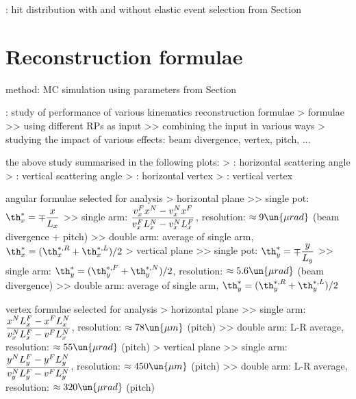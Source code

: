 \> : hit distribution with and without elastic event selection from Section 



\chapter[reco-form]{Reconstruction formulae}

\> method: MC simulation using parameters from Section 

\>  : study of performance of various kinematics reconstruction formulae
\>> formulae
\>>> using different RPs as input
\>>> combining the input in various ways
\>> studying the impact of various effects: beam divergence, vertex, pitch, ...

\> the above study summarised in the following plots:
\>> : horizontal scattering angle
\>> : vertical scattering angle
\>> : horizontal vertex
\>> : vertical vertex

\iffalse
\> \plot{reconstruction_formulae/plot_formulae_correlation.pdf} : study of left-right correlations of angle reconstruction errors
\>> significant in $x$ due to neglecting $x^*$
\fi

\> angular formulae selected for analysis
\>> horizontal plane
\>>> single pot: $\displaystyle \th_x^{*} = \mp {x\over L_x}$
\>>> single arm: $\displaystyle {v_x^F x^N - v_x^N x^F\over v_x^F L_x^N - v_x^N L_x^F}$, resolution: $\approx 9\un{\mu rad}$ (beam divergence + pitch)
\>>> double arm: average of single arm, $\th_x^* = (\th_x^{*,R} + \th_x^{*,L}) / 2$
\>> vertical plane
\>>> single pot: $\displaystyle \th_y^{*} = \mp {y\over L_y}$
\>>> single arm: $\displaystyle \th_y^{*} = (\th_y^{*,F} + \th_y^{*,N}) / 2$, resolution: $\approx 5.6\un{\mu rad}$ (beam divergence)
\>>> double arm: average of single arm, $\th_y^* = (\th_y^{*,R} + \th_y^{*,L}) / 2$

\> vertex formulae selected for analysis
\>> horizontal plane
\>>> single arm: $\displaystyle {x^N L_x^F - x^F L_x^N\over v_x^N L_x^F - v^F L_x^N}$, resolution: $\approx 78\un{\mu m}$ (pitch)
\>>> double arm: L-R average, resolution: $\approx 55\un{\mu rad}$ (pitch)
\>> vertical plane
\>>> single arm: $\displaystyle {y^N L_y^F - y^F L_y^N\over v_y^N L_y^F - v^F L_y^N}$, resolution: $\approx 450\un{\mu m}$ (pitch)
\>>> double arm: L-R average, resolution: $\approx 320\un{\mu rad}$ (pitch)





